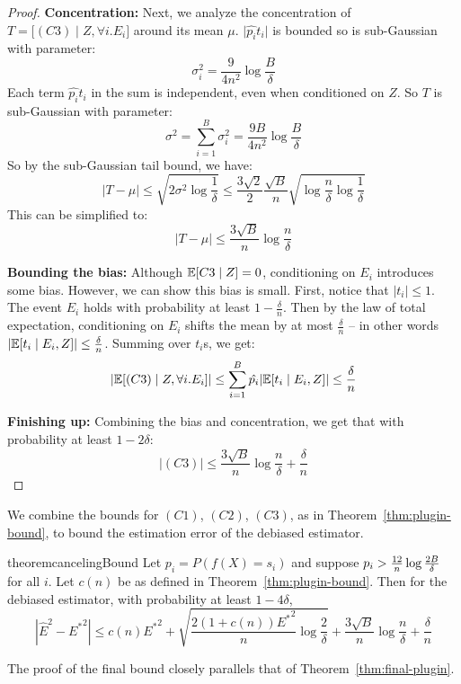 \begin{proof}
\textbf{Concentration:} Next, we analyze the concentration of $T = \big[(C3) \mid Z, \forall i. E_i\big]$ around its mean $\mu$. $\lvert \hat{p_i}t_i \rvert$ is bounded so is sub-Gaussian with parameter:
\[ \sigma_i^2 = \frac{9}{4n^2}\log{\frac{B}{\delta}} \]
Each term $\hat{p_i}t_i$ in the sum is independent, even when conditioned on $Z$.
So $T$ is sub-Gaussian with parameter:
\[ \sigma^2 = \sum_{i=1}^B \sigma_i^2 = \frac{9B}{4n^2}\log{\frac{B}{\delta}} \]
So by the sub-Gaussian tail bound, we have:
\[ \lvert T - \mu \rvert \leq \sqrt{2\sigma^2\log{\frac{1}{\delta}}} \leq \frac{3\sqrt{2}}{2} \frac{\sqrt{B}}{n} \sqrt{\log{\frac{n}{\delta}} \log{\frac{1}{\delta}}} \]
This can be simplified to:
\[ \lvert T - \mu \rvert \leq \frac{3\sqrt{B}}{n} \log{\frac{n}{\delta}} \]

\textbf{Bounding the bias:} Although $\mathbb{E}[C3 \mid Z] = 0$, conditioning on $E_i$ introduces some bias.
However, we can show this bias is small. First, notice that $|t_i| \leq 1$. The event $E_i$ holds with probability at least $1 - \frac{\delta}{n}$. Then by the law of total expectation, conditioning on $E_i$ shifts the mean by at most $\frac{\delta}{n}$ -- in other words $|\mathbb{E}[t_i \mid E_i, Z]| \leq \frac{\delta}{n}$.
Summing over $t_i$s, we get:
\[ \lvert \mathbb{E}[(C3) \mid Z, \forall i. E_i] \rvert \leq \sum_{i=1}^B \hat{p_i} \lvert \mathbb{E}[t_i \mid E_i, Z] \rvert \leq \frac{\delta}{n} \]

\textbf{Finishing up:} Combining the bias and concentration, we get that with probability at least $1 - 2\delta$:
\[ |(C3)| \leq \frac{3\sqrt{B}}{n} \log{\frac{n}{\delta}} + \frac{\delta}{n}\]

\end{proof}

We combine the bounds for $(C1)$, $(C2)$, $(C3)$, as in Theorem~\ref{thm:plugin-bound}, to bound the estimation error of the debiased estimator.

\begin{restatable}{theorem}{cancelingBound}
\label{thm:our-bound}
Let $p_i = P(f(X) = s_i)$ and suppose $p_i > \frac{12}{n}\log{\frac{2B}{\delta}}{}$ for all $i$. Let $c(n)$ be as defined in Theorem~\ref{thm:plugin-bound}. 
Then for the debiased estimator, with probability at least $1 - 4\delta$,
\[ | \hat{E}^2 - {E^*}^2 | \leq c(n){E^*}^2 + \sqrt{\frac{2(1+c(n)){E^*}^2}{n} \log{\frac{2}{\delta}}} + \frac{3\sqrt{B}}{n} \log{\frac{n}{\delta}} + \frac{\delta}{n}\]
\end{restatable}

The proof of the final bound closely parallels that of Theorem~\ref{thm:final-plugin}.

\finalCanceling*
